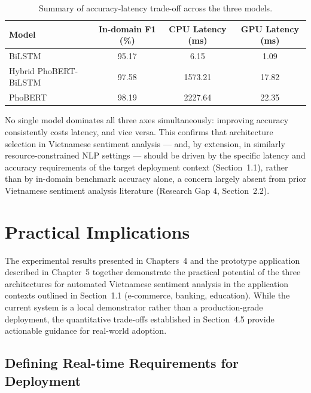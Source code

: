 \documentclass[12pt]{report} %
\begin{document}
\begin{table}[htbp]
    \centering
    \caption{Summary of accuracy-latency trade-off across the three models.}
    \label{tab:tradeoff-summary}
    \begin{tabular}{lccc}
        \hline
        \textbf{Model}        & \textbf{In-domain F1 (\%)} & \textbf{CPU Latency (ms)} & \textbf{GPU Latency (ms)} \\
        \hline
        BiLSTM                & 95.17                      & 6.15                      & 1.09                      \\
        Hybrid PhoBERT-BiLSTM & 97.58                      & 1573.21                   & 17.82                     \\
        PhoBERT               & 98.19                      & 2227.64                   & 22.35                     \\
        \hline
    \end{tabular}
\end{table}

No single model dominates all three axes simultaneously: improving accuracy consistently costs latency, and vice versa. This confirms that architecture selection in Vietnamese sentiment analysis --- and, by extension, in similarly resource-constrained NLP settings --- should be driven by the specific latency and accuracy requirements of the target deployment context (Section~1.1), rather than by in-domain benchmark accuracy alone, a concern largely absent from prior Vietnamese sentiment analysis literature (Research Gap 4, Section~2.2).

\section{Practical Implications}

The experimental results presented in Chapters~4 and the prototype application described in Chapter~5 together demonstrate the practical potential of the three architectures for automated Vietnamese sentiment analysis in the application contexts outlined in Section~1.1 (e-commerce, banking, education). While the current system is a local demonstrator rather than a production-grade deployment, the quantitative trade-offs established in Section~4.5 provide actionable guidance for real-world adoption.

\subsection{Defining Real-time Requirements for Deployment}
\label{subsec:realtime-definition}
\end{document}

